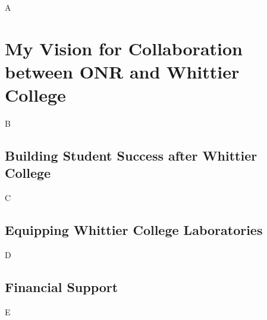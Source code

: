 \documentclass[../../../main.tex]{subfiles}
\begin{document}
A
\section{My Vision for Collaboration between ONR and Whittier College}
B
\subsection{Building Student Success after Whittier College}
C
\subsection{Equipping Whittier College Laboratories}
D
\subsection{Financial Support}
E
\end{document}
